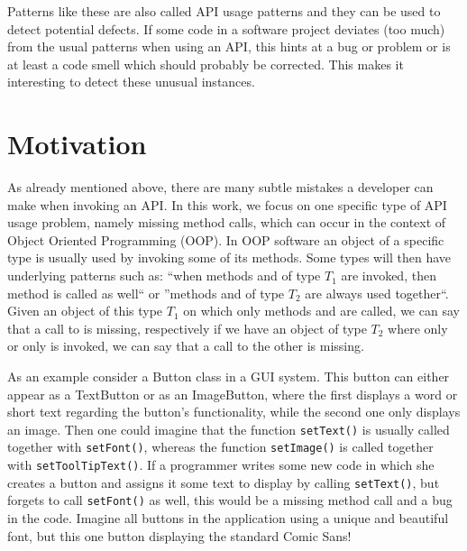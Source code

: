 Patterns like these are also called API usage patterns \cite{robillard2013automated} and they can be used to detect potential defects.
If some code in a software project deviates (too much) from the usual patterns when using an API, this hints at a bug or problem or is at least a code smell which should probably be corrected.
This makes it interesting to detect these unusual instances.

\section{Motivation}

As already mentioned above, there are many subtle mistakes a developer can make when invoking an API.
In this work, we focus on one specific type of API usage problem, namely missing method calls, which can occur in the context of Object Oriented Programming (OOP).
In OOP software an object of a specific type is usually used by invoking some of its methods.
Some types will then have underlying patterns such as: ``when methods  and  of type $T_1$ are invoked, then method  is called as well`` or ''methods  and  of type $T_2$ are always used together``.
Given an object of this type $T_1$ on which only methods  and  are called, we can say that a call to  is missing, respectively if we have an object of type $T_2$ where only  or only  is invoked, we can say that a call to the other is missing.

As an example consider a Button class in a GUI system.
This button can either appear as a TextButton or as an ImageButton, where the first displays a word or short text regarding the button's functionality, while the second one only displays an image.
Then one could imagine that the function \texttt{setText()} is usually called together with \texttt{setFont()}, whereas the function \texttt{setImage()} is called together with \texttt{setToolTipText()}.
If a programmer writes some new code in which she creates a button and assigns it some text to display by calling \texttt{setText()}, but forgets to call \texttt{setFont()} as well, this would be a missing method call and a bug in the code.
Imagine all buttons in the application using a unique and beautiful font, but this one button displaying the standard Comic Sans!

